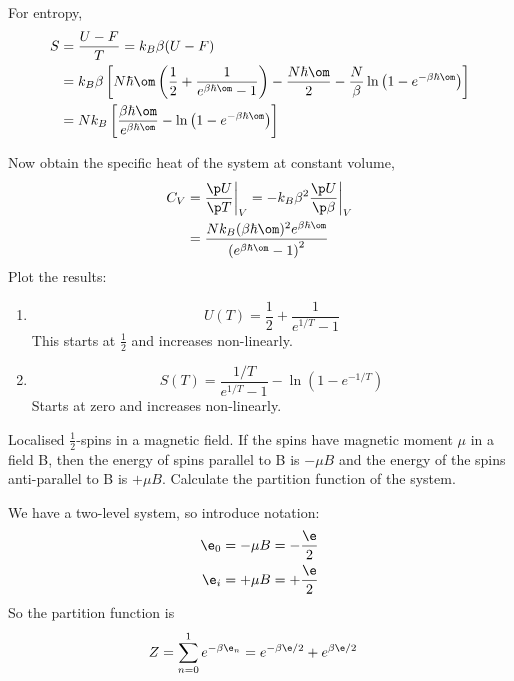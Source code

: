 \documentclass[a4paper, 11pt, normalem]{report}
\begin{document}
For entropy,
\begin{align}
    S &= \frac{U - F}{T} = k_B\beta(U - F) \\
      &= k_B\beta \left[N\hbar\om\left(\frac{1}{2} + \frac{1}{e^{\beta\hbar\om} - 1}\right) - \frac{N\hbar\om}{2} - \frac{N}{\beta}\ln\left(1 - e^{-\beta\hbar\om}\right)\right] \\
      &= Nk_B\left[\frac{\beta\hbar\om}{e^{\beta\hbar\om}} - \ln\left(1 - e^{-\beta\hbar\om}\right)\right]
\end{align}

Now obtain the specific heat of the system at constant volume,
\begin{align}
    C_V &= \frac{\p U}{\p T}\bigg|_V = -k_B\beta^2 \frac{\p U}{\p \beta}\bigg|_V \\
        &= \frac{Nk_B(\beta\hbar\om)^2e^{\beta\hbar\om}}{\left(e^{\beta\hbar\om}-1\right)^2}
\end{align}
Plot the results:
\begin{enumerate}
    \item
        \begin{equation}
            U(T) = \frac{1}{2} + \frac{1}{e^{1/T} - 1}
        \end{equation}
        This starts at $\frac{1}{2}$ and increases non-linearly.
    \item
        \begin{equation}
            S(T) = \frac{1/T}{e^{1/T} - 1} - \ln(1 - e^{-1/T})
        \end{equation}
        Starts at zero and increases non-linearly.
\end{enumerate}

\begin{example}
    Localised $\frac{1}{2}$-spins in a magnetic field.
    If the spins have magnetic moment $\mu$ in a field B, then the energy of spins parallel to B is $-\mu B$ and the energy of the spins anti-parallel to B is $+\mu B$.
    Calculate the partition function of the system.

    We have a two-level system, so introduce notation:
    \begin{align}
        \e_0 &= -\mu B = -\frac{\e}{2} \\
        \e_i &= +\mu B = +\frac{\e}{2}
    \end{align}
    So the partition function is
    \begin{align}
        Z &= \sum_{n=0}^1 e^{-\beta\e_n} = e^{-\beta\e/2} + e^{\beta\e/2}
    \end{align}
\end{example}
\end{document}
